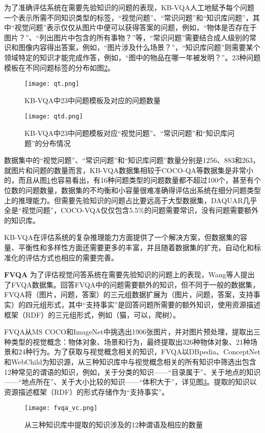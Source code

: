 为了准确评估系统在需要先验知识的问题的表现，KB-VQA人工地赋予每个问题一个表示所需不同知识类型的标签，“视觉问题”、“常识问题”和“知识库问题”，其中“视觉问题”表示仅仅从图片中便可以获得答案的问题，例如，“物体是否存在于图片？”、“列出图片中包含的所有事物？”等，“常识问题”需要结合成人级别的常识和图像内容得出答案，例如，“图片涉及什么场景？”，“知识库问题”则需要某个领域特定的知识才能完成作答，例如，“图中的物品在哪一年被发明？”。23种问题模板在不同问题标签的分布如图\ref{qtd}。
\begin{figure}[H]
	\centering
	\texttt{[image: qt.png]}
	\caption{KB-VQA中23中问题模板及对应的问题数量}
	\label{qt}
\end{figure}
\begin{figure}[H]
	\centering
	\texttt{[image: qtd.png]}
	\caption{KB-VQA中23中问题模板对应“视觉问题”、“常识问题”和“知识库问题”的分布情况}
	\label{qtd}
\end{figure}

数据集中的“视觉问题”、“常识问题”和“知识库问题”数量分别是1256、883和263，就图片和问题的数量而言，KB-VQA数据集相较于COCO-QA等数据集是非常小的，而且从图\ref{qt}也容易看出，有16种问题类型的问题数量都不超过100个，甚至有个位数的问题数量，数据集的不均衡和小容量很难准确得评估出系统在细分问题类型上的推理能力。但需要先验知识的问题占比要远高于大型数据集，DAQUAR几乎全是“视觉问题”，COCO-VQA仅仅包含5.5\%的问题需要常识，没有问题需要额外的知识库。

KB-VQA在评估系统的复杂推理能力方面提供了一个解决方案，但数据集的容量、平衡性和多样性方面还需要更多的丰富，并且随着数据集的扩充，自动化和标准化的评估方式也相应的需要完善。

\textbf{FVQA}
为了评估视觉问答系统在需要先验知识的问题上的表现，Wang等人提出了FVQA数据集。回答FVQA中的问题需要额外的知识，但不同于一般的数据集，FVQA将（图片，问题，答案）的三元组数据扩展为（图片，问题，答案，支持事实）的四元组形式，其中“支持事实”是回答问题所需要的额外知识，使用资源描述框架（RDF）的三元组形式，例如（猫，可以，爬树）。

FVQA从MS COCO和ImageNet中挑选出1906张图片，并对图片预处理，提取出三种类型的视觉概念：物体对象、场景和行为，最终提取出326种物体对象、21种场景和24种行为。为了获取与视觉概念相关的知识，FVQA以DBpedia、ConceptNet和WebChild为知识源，从三种知识库中与视觉概念相关的所有知识中筛选出包含12种常见的谓语的知识，例如，关于分类的知识——“目录属于”、关于地点的知识——“地点所在”、关于大小比较的知识——“体积大于”，详见图\ref{fvqa_vc}。提取的知识以资源描述框架（RDF）的形式存储作为“支持事实”。
\begin{figure}[H]
	\centering
	\texttt{[image: fvqa\_vc.png]}
	\caption{从三种知识库中提取的知识涉及的12种谓语及相应的数量}
	\label{fvqa_vc}
\end{figure}

